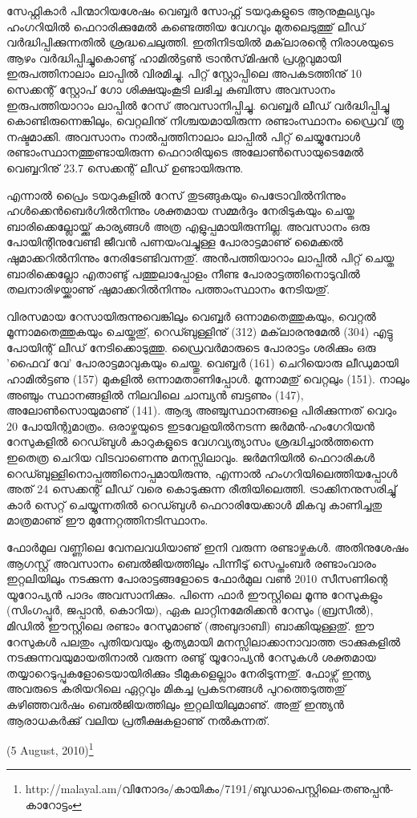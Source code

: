 സേഫ്റ്റികാര്‍ പിന്മാറിയശേഷം വെബ്ബര്‍ സോഫ്റ്റ് ടയറുകളുടെ ആനുകൂല്യവും ഹംഗറിയില്‍ ഫെറാരിക്കുമേല്‍ കണ്ടെത്തിയ 
വേഗവും മുതലെടുത്തു് ലീഡ് വര്‍ദ്ധിപ്പിക്കുന്നതില്‍ ശ്രദ്ധചെലുത്തി. ഇതിനിടയില്‍ മക്‌ലാരന്റെ നിരാശയുടെ ആഴം 
വര്‍ദ്ധിപ്പിച്ചുകൊണ്ടു് ഹാമില്‍ട്ടണ്‍ ട്രാന്‍സ്‌മിഷന്‍ പ്രശ്നവുമായി ഇരുപത്തിനാലാം ലാപ്പില്‍ വിരമിച്ചു. പിറ്റ് സ്റ്റോപ്പിലെ 
അപകടത്തിനു് 10 സെക്കന്റ് സ്റ്റോപ് ഗോ ശിക്ഷയുംകൂടി ലഭിച്ച കുബിത്സ അവസാനം ഇരുപത്തിയാറാം ലാപ്പില്‍ 
റേസ് അവസാനിപ്പിച്ചു. വെബ്ബര്‍ ലീഡ് വര്‍ദ്ധിപ്പിച്ചു കൊണ്ടിരുന്നെങ്കിലും, വെറ്റലിനു്
നിശ്ചയമായിരുന്ന രണ്ടാംസ്ഥാനം ഡ്രൈവ് ത്രൂ നഷ്ടമാക്കി. അവസാനം നാല്‍പ്പത്തിനാലാം ലാപ്പില്‍ പിറ്റ് ചെയ്യുമ്പോള്‍ രണ്ടാംസ്ഥാനത്തുണ്ടായിരുന്ന 
ഫെറാരിയുടെ അലോണ്‍സൊയുടെമേല്‍ വെബ്ബറിനു് 23.7 സെക്കന്റ് ലീഡ് ഉണ്ടായിരുന്നു.

എന്നാല്‍ പ്രൈം ടയറുകളില്‍ റേസ് തുടങ്ങുകയും പെട്രോവില്‍നിന്നും ഹള്‍ക്കെന്‍ബെര്‍ഗില്‍നിന്നും ശക്തമായ സമ്മര്‍ദ്ദം 
നേരിടുകയും ചെയ്ത ബാരിക്കെല്ലോയ്ക്കു് കാര്യങ്ങള്‍ അത്ര എളുപ്പമായിരുന്നില്ല. അവസാനം ഒരു പോയിന്റിനുവേണ്ടി ജീവന്‍ 
പണയംവച്ചുള്ള പോരാട്ടമാണു് മൈക്കല്‍ ഷുമാക്കറില്‍നിന്നും നേരിടേണ്ടിവന്നതു്. അന്‍പത്തിയാറാം ലാപ്പില്‍ പിറ്റ് 
ചെയ്ത ബാരിക്കെല്ലോ എതാണ്ടു് പത്തുലാപ്പോളം നീണ്ട പോരാട്ടത്തിനൊടുവില്‍ തലനാരിഴയ്ക്കാണു് ഷുമാക്കറില്‍നിന്നും 
പത്താംസ്ഥാനം നേടിയതു്.

വിരസമായ റേസായിരുന്നുവെങ്കിലും വെബ്ബര്‍ ഒന്നാമതെത്തുകയും, വെറ്റല്‍ മൂന്നാമതെത്തുകയും ചെയ്തതു്, റെഡ്ബുള്ളിനു് 
(312) മക്‌ലാരനുമേല്‍ (304) എട്ടു പോയിന്റ് ലീഡ് നേടിക്കൊടുത്തു. ഡ്രൈവര്‍മാരുടെ പോരാട്ടം ശരിക്കും ഒരു 'ഫൈവ് 
വേ' പോരാട്ടമാവുകയും ചെയ്തു. വെബ്ബര്‍ (161) ചെറിയൊരു ലീഡുമായി ഹാമില്‍ട്ടണു (157) മുകളില്‍ ഒന്നാമതാണിപ്പോള്‍. 
മൂന്നാമതു് വെറ്റലും (151). നാലും അഞ്ചും സ്ഥാനങ്ങളില്‍ നിലവിലെ ചാമ്പ്യന്‍ ബട്ടണും (147), 
അലോണ്‍സൊയുമാണു് (141). ആദ്യ അഞ്ചുസ്ഥാനങ്ങളെ പിരിക്കുന്നത് വെറും 20 പോയിന്റുമാത്രം. ഒരാഴ്ചയുടെ 
ഇടവേളയില്‍നടന്ന ജര്‍മന്‍-ഹംഗേറിയന്‍ റേസുകളില്‍ റെഡ്ബുള്‍ കാറുകളുടെ വേഗവ്യത്യാസം ശ്രദ്ധിച്ചാല്‍ത്തന്നെ 
ഇതെത്ര ചെറിയ വിടവാണെന്നു മനസ്സിലാവും. ജര്‍മനിയില്‍ ഫെറാരികള്‍ റെഡ്ബുള്ളിനൊപ്പത്തിനൊപ്പമായിരുന്നു, 
എന്നാല്‍ ഹംഗറിയിലെത്തിയപ്പോള്‍ അത് 24 സെക്കന്റ് ലീഡ് വരെ കൊടുക്കുന്ന രീതിയിലെത്തി. ട്രാക്കിനനുസരിച്ചു് 
കാര്‍ സെറ്റ് ചെയ്യുന്നതില്‍ റെഡ്ബുള്‍ ഫെറാരിയേക്കാള്‍ മികവു കാണിച്ചതു മാത്രമാണു് ഈ മുന്നേറ്റത്തിനടിസ്ഥാനം.

ഫോര്‍മുല വണ്ണിലെ വേനലവധിയാണു് ഇനി വരുന്ന രണ്ടാഴ്ചകള്‍. അതിനുശേഷം ആഗസ്റ്റ് അവസാനം 
ബെല്‍ജിയത്തിലും പിന്നീടു് സെപ്തംബര്‍ രണ്ടാംവാരം ഇറ്റലിയിലും നടക്കുന്ന പോരാട്ടങ്ങളോടെ ഫോര്‍മുല വണ്‍ 2010 
സീസണിന്റെ യൂറോപ്യന്‍ പാദം അവസാനിക്കും. പിന്നെ ഫാര്‍ ഈസ്റ്റിലെ മൂന്നു റേസുകളും (സിംഗപ്പൂര്‍, ജപ്പാന്‍, കൊറിയ),
ഏക ലാറ്റിനമേരിക്കന്‍ റേസും (ബ്രസീല്‍), മിഡില്‍ ഈസ്റ്റിലെ രണ്ടാം റേസുമാണു് (അബുദാബി) ബാക്കിയുള്ളതു്. ഈ 
റേസുകള്‍ പലതും പുതിയവയും കൃത്യമായി മനസ്സിലാക്കാനാവാത്ത ട്രാക്കുകളില്‍ നടക്കുന്നവയുമായതിനാല്‍ വരുന്ന രണ്ടു് 
യൂറോപ്യന്‍ റേസുകള്‍ ശക്തമായ തയ്യാറെടുപ്പുകളോടെയായിരിക്കും ടീമുകളെല്ലാം നേരിടുന്നതു്. ഫോഴ്സ് ഇന്ത്യ അവരുടെ 
കരിയറിലെ ഏറ്റവും മികച്ച പ്രകടനങ്ങള്‍ പുറത്തെടുത്തതു് കഴിഞ്ഞവര്‍ഷം ബെല്‍ജിയത്തിലും ഇറ്റലിയിലുമാണു്. 
അതു് ഇന്ത്യന്‍ ആരാധകര്‍ക്കു് വലിയ പ്രതീക്ഷകളാണു് നല്‍കുന്നത്.

\begin{flushright}(5 August, 2010)\footnote{http://malayal.am/വിനോദം/കായികം/7191/ബുഡാപെസ്റ്റിലെ-തണുപ്പന്‍-കാറോട്ടം}\end{flushright}

\newpage
